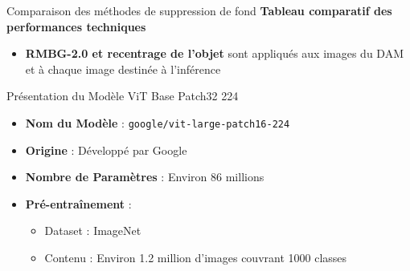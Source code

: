 \documentclass{beamer}
\begin{document}
\begin{frame}{Comparaison des méthodes de suppression de fond}
    \textbf{Tableau comparatif des performances techniques}
    \begin{table}[]
        \centering
        \caption{Comparaison entre U2Net et RMBG-2.0}
    \end{table}
    \begin{itemize}
        \item \textbf{RMBG-2.0 et recentrage de l'objet} sont appliqués aux images du DAM et à chaque image destinée à l'inférence
    \end{itemize}
\end{frame}

\begin{frame}{Présentation du Modèle ViT Base Patch32 224}
    \begin{itemize}
        \item \textbf{Nom du Modèle} : \texttt{google/vit-large-patch16-224}
        \item \textbf{Origine} : Développé par Google
        \item \textbf{Nombre de Paramètres} : Environ 86 millions
        \item \textbf{Pré-entraînement} : 
        \begin{itemize}
            \item Dataset : ImageNet
            \item Contenu : Environ 1.2 million d'images couvrant 1000 classes
        \end{itemize}
    \end{itemize}
    \vspace{0.5cm}
\end{frame}
\end{document}
